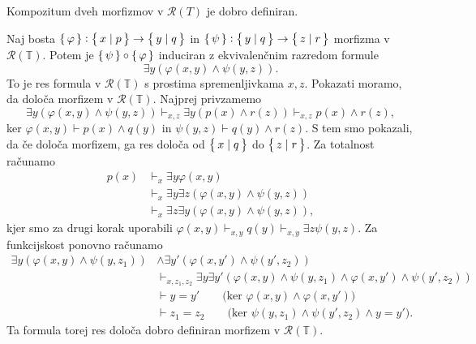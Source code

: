 \documentclass[../kategoricna_logika.tex]{subfiles}
\begin{document}
\begin{lema}
  Kompozitum dveh morfizmov v $\mathcal{R}(T)$ je dobro definiran.
\end{lema}
\begin{dokaz}
  Naj bosta $\left\lbrace\,\varphi\,\right\rbrace : \left\lbrace\,x \mid p\,\right\rbrace \to \left\lbrace\,y \mid q\,\right\rbrace$ in
  $\left\lbrace\,\psi\,\right\rbrace : \left\lbrace\,y \mid q\,\right\rbrace \to \left\lbrace\,z \mid r\,\right\rbrace$ morfizma v $\mathcal{R}(\mathbb{T})$.
  Potem je $\left\lbrace\,\psi\,\right\rbrace \circ \left\lbrace\,\varphi\,\right\rbrace$ induciran z ekvivalenčnim razredom
  formule
  \[ \exists y(\varphi(x,y) \land \psi(y,z)). \]
  To je res formula v $\mathcal{R}(\mathbb{T})$ s prostima spremenljivkama $x, z$.
  Pokazati moramo, da določa morfizem v $\mathcal{R}(\mathbb{T})$. Najprej privzamemo
  \[  \exists y(\varphi(x,y) \land \psi(y,z)) \vdash_{x,z}\exists y(p(x) \land r(z))
    \vdash_{x,z}p(x) \land r(z), \]
  ker $\varphi(x,y) \vdash p(x) \land q(y)$ in $\psi(y,z) \vdash q(y) \land r(z)$.
  S tem smo pokazali, da če določa morfizem,
  ga res določa od $\left\lbrace\,x \mid q\,\right\rbrace$ do $\left\lbrace\,z \mid r\,\right\rbrace$.
  Za totalnost računamo
  \begin{align*}
    p(x) &\vdash_{x} \exists y \varphi(x,y) \\
         &\vdash_{x} \exists y \exists z (\varphi(x,y) \land \psi(y,z)) \\
    &\vdash_{x} \exists z \exists y(\varphi(x,y) \land \psi(y,z)),
  \end{align*}
  kjer smo za drugi korak uporabili
  $\varphi(x,y) \vdash_{x,y} q(y) \vdash_{x,y} \exists z \psi(y,z)$.
  Za funkcijskost ponovno računamo
  \begin{align*}
    \exists y(\varphi(x,y) \land \psi(y,z_{1})) &\land \exists y' (\varphi(x,y') \land \psi(y',z_{2})) \\
                                                &\vdash_{x,z_{1}, z_{2}} \exists y \exists y' (\varphi(x,y) \land \psi(y,z_{1}) \land \varphi(x,y') \land \psi(y',z_{2})) \\
                                                &\vdash y = y' \qquad \text{(ker $\varphi(x,y) \land \varphi(x,y')$)} \\
    &\vdash z_{1} = z_{2} \qquad \text{(ker $\psi(y,z_{1}) \land \psi(y',z_{2}) \land y=y'$)}.
  \end{align*}
  Ta formula torej res določa dobro definiran morfizem v $\mathcal{R}(\mathbb{T})$.
\end{dokaz}
\end{document}
